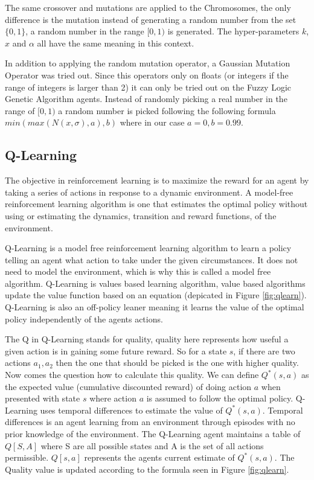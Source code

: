 \documentclass[10pt, a4paper, twocolumn]{article}
\begin{document}
The same crossover and mutations are applied to the Chromosomes, the only difference is the mutation instead of generating a random number from the set $\{0, 1\}$, a random number in the range $[0, 1)$ is generated. The hyper-parameters $k$, $x$ and $\alpha$ all have the same meaning in this context. 

In addition to applying the random mutation operator, a Gaussian Mutation Operator was tried out. Since this operators only on floats (or integers if the range of integers is larger than 2) it can only be tried out on the Fuzzy Logic Genetic Algorithm agents. Instead of randomly picking a real number in the range of $[0, 1)$ a random number is picked following the following formula $min(max(N(x, \sigma), a), b)$ where in our case $a = 0, b = 0.99$. 

\subsection{Q-Learning}

The objective in reinforcement learning is to maximize the reward for an agent by taking a series of actions in response to a dynamic environment. A model-free reinforcement learning algorithm is one that estimates the optimal policy without using or estimating the dynamics, transition and reward functions, of the environment. 

Q-Learning is a model free reinforcement learning algorithm to learn a policy telling an agent what action to take under the given circumstances. It does not need to model the environment, which is why this is called a model free algorithm. Q-Learning is values based learning algorithm, value based algorithms update the value function based on an equation (depicated in Figure \ref{fig:qlearn}). Q-Learning is also an off-policy leaner meaning it learns the value of the optimal policy independently of the agents actions. 

The Q in Q-Learning stands for quality, quality here represents how useful a given action is in gaining some future reward. So for a state $s$, if there are two actions $a_1, a_2$ then the one that should be picked is the one with higher quality. Now comes the question how to calculate this quality. We can define $Q^*(s, a)$ as the expected value (cumulative discounted reward) of doing action $a$ when presented with state $s$ where action $a$ is assumed to follow the optimal policy. Q-Learning uses temporal differences to estimate the value of $Q^*(s, a)$. Temporal differences is an agent learning from an environment through episodes with no prior knowledge of the environment. The Q-Learning agent maintains a table of $Q[S, A]$ where S are all possible states and A is the set of all actions permissible.  $Q[s, a]$ represents the agents current estimate of $Q^*(s, a)$. The Quality value is updated according to the formula seen in Figure \ref{fig:qlearn}.
\end{document}

